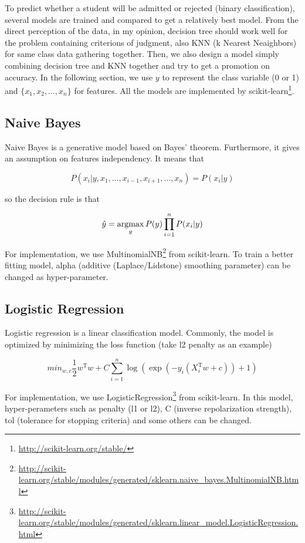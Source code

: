 \documentclass{article}
\begin{document}
To predict whether a student will be admitted or rejected (binary classification), several models are trained and compared to get a relatively best model. From the direct perception of the data, in my opinion, decision tree should work well for the problem containing criterions of judgment, also KNN (k Nearest Neaighbors) for same class data gathering together. Then, we also design a model simply combining decision tree and KNN together and try to get a promotion on accuracy. In the following section, we use $y$ to represent the class variable (0 or 1) and $\{x_1,x_2,\dots, x_n\}$ for features. All the models are implemented by scikit-learn\footnote{\url{http://scikit-learn.org/stable/}}.

\subsection{Naive Bayes}

Naive Bayes is a generative model based on Bayes’ theorem. Furthermore, it gives an assumption on features independency. It means that

$$
P(x_i|y,x_1,\dots,x_{i-1},x_{i+1},\dots,x_n)=P(x_i|y)
$$

so the decision rule is that

\newcommand{\argmax}{\operatornamewithlimits{argmax}}
$$
\hat{y}=\argmax_yP(y)\prod_{i=1}^nP(x_i|y)
$$

For implementation, we use MultinomialNB\footnote{\url{http://scikit-learn.org/stable/modules/generated/sklearn.naive_bayes.MultinomialNB.html}} from scikit-learn. To train a better fitting model, alpha (additive (Laplace/Lidstone) smoothing parameter) can be changed as hyper-parameter.

\subsection{Logistic Regression}

Logistic regression is a linear classification model. Commonly, the model is optimized by minimizing the loss function (take l2 penalty as an example)

$$
min_{w,c}\frac{1}{2}w^\mathrm{T}w+C\sum_{i=1}^n\log(\exp(-y_i(X_i^\mathrm{T}w+c))+1)
$$

For implementation, we use LogisticRegression\footnote{\url{http://scikit-learn.org/stable/modules/generated/sklearn.linear_model.LogisticRegression.html}} from scikit-learn. In this model, hyper-perameters such as penalty (l1 or l2), C (inverse repolarization strength), tol (tolerance for stopping criteria) and some others can be changed.
\end{document}
